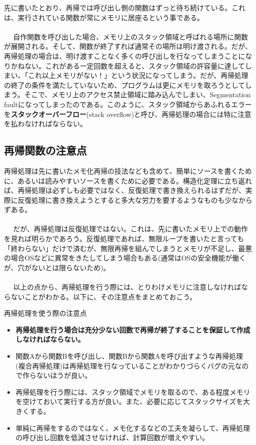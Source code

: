 先に書いたとおり、再帰では呼び出し側の関数はずっと待ち続けている。これは、実行されている関数が常にメモリに居座るという事である。
\\ \\　
自作関数を呼び出した場合、メモリ上のスタック領域と呼ばれる場所に関数が展開される。そして、関数が終了すれば通常その場所は明け渡される。だが、再帰処理の場合は、明け渡すことなく多くの呼び出しを行なってしまうことになりかねない。これがある一定回数を超えると、スタック領域の許容量に達してしまい、「これ以上メモリがない！」という状況になってしまう。だが、再帰処理の終了の条件を満たしていないため、プログラムは更にメモリを取ろうとしてしまう。そこで、メモリ上のアクセス禁止領域に踏み込んでしまい、Segmentation faultになってしまったのである。このように、スタック領域からあふれるエラーを\textbf{スタックオーバーフロー}(stack overflow)と呼び、再帰処理の場合には特に注意を払わなければならない。

\subsection{再帰関数の注意点}
再帰処理は先に書いたメモ化再帰の技法なども含めて、簡単にソースを書くために、あるいは読みやすいソースを書くために必要である。構造化定理に立ち返れば、再帰処理は必ずしも必要ではなく、反復処理で書き換えられるはずだが、実際に反復処理に書き換えようとすると多大な労力を要するようなものも少なからずある。
\\ \\　
だが、再帰処理は反復処理ではない。これは、先に書いたメモリ上での動作を見れば明らかであろう。反復処理であれば、無限ループを書いたと言っても「終わらない」だけで済むが、無限再帰を組んでしまうとメモリが不足し、最悪の場合OSなどに異常をきたしてしまう場合もある(通常はOSの安全機能が働くが、穴がないとは限らないため)。
\\ \\　
以上の点から、再帰処理を行う際には、とりわけメモリに注意しなければならないことがわかる。以下に、その注意点をまとめておこう。
\begin{itembox}[l]{再帰処理を使う際の注意点}
\begin{itemize}
\item \textbf{再帰処理を行う場合は充分少ない回数で再帰が終了することを保証して作成しなければならない。}
\item 関数Aから関数Bを呼び出し、関数Bから関数Aを呼び出すような再帰処理(複合再帰処理)は再帰処理を行なっていることがわかりづらくバグの元なので作らないほうが良い。
\item 再帰処理を行う際には、スタック領域でメモリを取るので、ある程度メモリを空けておいて実行する方が良い。また、必要に応じてスタックサイズを大きくする。
\item 単純に再帰をするのではなく、メモ化するなどの工夫を凝らして、再帰処理の呼び出し回数を低減させなければ、計算回数が増えやすい。
\end{itemize}
\end{itembox}

